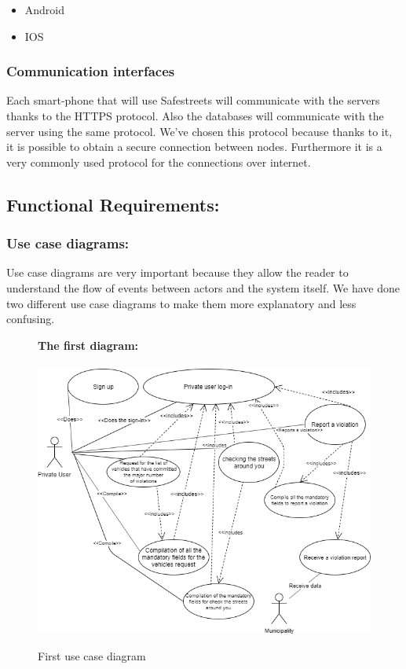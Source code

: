 \documentclass[titlepage]{article}
\begin{document}
\begin{itemize}
	\item Android 
	\item IOS
\end{itemize}
	
\subsubsection{Communication interfaces }
Each smart-phone that will use Safestreets will communicate with the servers thanks to the HTTPS protocol. Also the databases will communicate with the server using the same protocol. We've chosen this protocol because thanks to it, it is possible to obtain a secure connection between nodes. Furthermore it is a very commonly used protocol for the connections over internet.
\subsection{Functional Requirements:}
\subsubsection{Use case diagrams: }
Use case diagrams are very important because they allow the reader to understand the flow of events between actors and the system itself. We have done two different use case diagrams to make them more explanatory and less confusing.

\begin{figure}[h]
	\textbf{The first diagram:\\ \\}
	\includegraphics[scale=0.65]{use case diagrams/use case diagrams.png}
	\centering
	\caption{First use case diagram}
\end{figure}
\FloatBarrier
\end{document}
